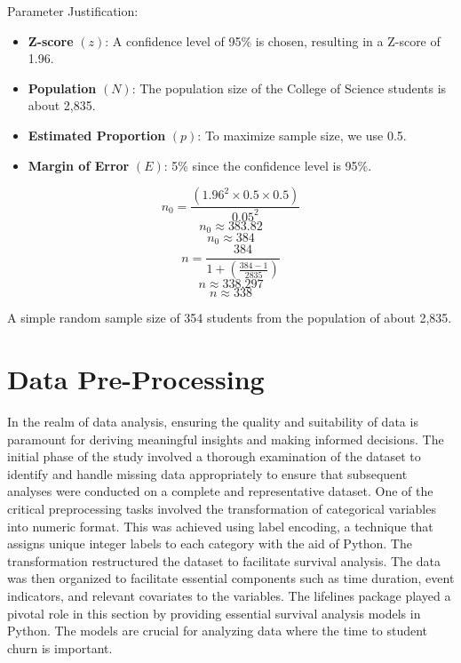 \documentclass[doublespacing]{report} [12px]%
\begin{document}
Parameter Justification:

\begin{itemize}
    \item \textbf{Z-score} \((z)\): A confidence level of 95\% is chosen, resulting in a Z-score of 1.96.
    \item \textbf{Population} \((N)\): The population size of the College of Science students is about 2,835.
    \item \textbf{Estimated Proportion} \((p)\): To maximize sample size, we use 0.5.
    \item \textbf{Margin of Error} \((E)\): 5\% since the confidence level is 95\%.
\end{itemize}

\begin{equation}
n_0 = \frac{\left(1.96^2 \times 0.5 \times 0.5\right)}{0.05^2}
\end{equation}
\begin{equation}
n_0 \approx 383.82
\end{equation}
\begin{equation}
n_0 \approx 384
\end{equation}
\begin{equation}
n = \frac{384}{1 + \left(\frac{384 - 1}{2835}\right)}
\end{equation}
\begin{equation}
n \approx 338.297
\end{equation}
\begin{equation}
n \approx 338
\end{equation}

A simple random sample size of 354 students from the population of about 2,835.


\section{Data Pre-Processing}

In the realm of data analysis, ensuring the quality and suitability of data is paramount for deriving meaningful insights and making informed decisions. The initial phase of the study involved a thorough examination of the dataset to identify and handle missing data appropriately to ensure that subsequent analyses were conducted on a complete and representative dataset. One of the critical preprocessing tasks involved the transformation of categorical variables into numeric format. This was achieved using label encoding, a technique that assigns unique integer labels to each category with the aid of Python. The transformation restructured the dataset to facilitate survival analysis. The data was then organized to facilitate essential components such as time duration, event indicators, and relevant covariates to the variables. 
The lifelines package played a pivotal role in this section by providing essential survival analysis models in Python. The models are crucial for analyzing data where the time to student churn is important. 
\end{document}
